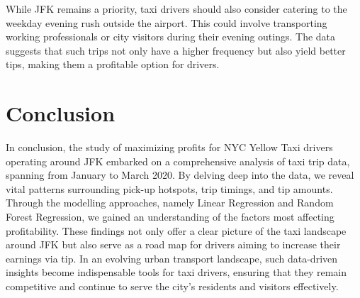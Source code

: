 \documentclass[11pt]{article}
\begin{document}
While JFK remains a priority, taxi drivers should also consider catering to the weekday evening rush outside the airport. This could involve transporting working professionals or city visitors during their evening outings. The data suggests that such trips not only have a higher frequency but also yield better tips, making them a profitable option for drivers.

\section{Conclusion}
In conclusion, the study of maximizing profits for NYC Yellow Taxi drivers operating around JFK embarked on a comprehensive analysis of taxi trip data, spanning from January to March 2020. By delving deep into the data, we reveal vital patterns surrounding pick-up hotspots, trip timings, and tip amounts. Through the modelling approaches, namely Linear Regression and Random Forest Regression, we gained an understanding of the factors most affecting profitability. These findings not only offer a clear picture of the taxi landscape around JFK but also serve as a road map for drivers aiming to increase their earnings via tip. In an evolving urban transport landscape, such data-driven insights become indispensable tools for taxi drivers, ensuring that they remain competitive and continue to serve the city's residents and visitors effectively. 

\clearpage
\printbibliography
\end{document}
